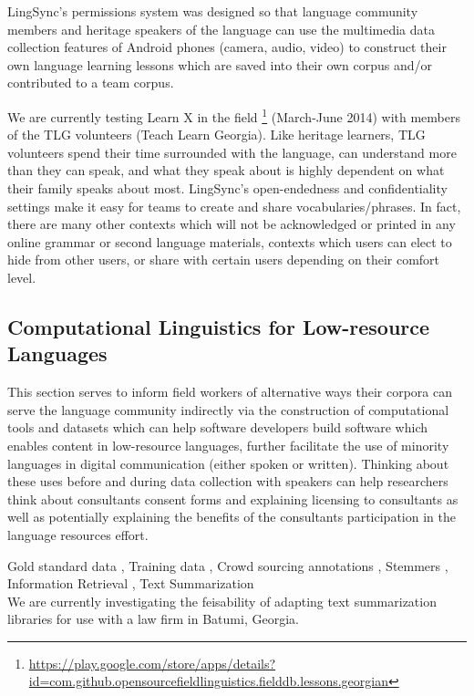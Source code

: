 \documentclass[11pt]{article}
\begin{document}
LingSync's permissions system was designed so that language community members
and heritage speakers of the language can use the multimedia data collection
features of Android phones (camera, audio, video) to construct their own
language learning lessons which are saved into their own corpus and/or
contributed to a team corpus.

We are currently testing Learn X in the field%
\footnote{\url{https://play.google.com/store/apps/details?id=com.github.opensourcefieldlinguistics.fielddb.lessons.georgian}} %
(March-June 2014) with members of the TLG volunteers (Teach Learn Georgia).
Like heritage learners, TLG volunteers spend their time surrounded with the
language, can understand more than they can speak, and what they speak about is
highly dependent on what their family speaks about most. LingSync's
open-endedness and confidentiality settings make it easy for teams to create
and share vocabularies/phrases.
In fact, there are many other contexts which will not be acknowledged or printed
in any online grammar or second language materials, contexts which users can
elect to hide from other users, or share with certain users depending on their
comfort level.


\subsection{Computational Linguistics for Low-resource Languages}

This section serves to inform field workers of alternative ways their corpora can serve the language community indirectly via the construction of computational tools and datasets which can help software developers build software which enables content in low-resource languages, further facilitate the use of minority languages in digital communication (either spoken or written). Thinking about these uses before and during data collection with speakers can help researchers think about consultants consent forms and explaining licensing to consultants as well as potentially explaining the benefits of the consultants participation in the language resources effort.

	 Gold standard data
	, Training data
	, Crowd sourcing annotations
	, Stemmers
	, Information Retrieval
	, Text Summarization\\
	
	We are currently investigating the feisability of adapting text summarization libraries for use with a law firm in Batumi, Georgia. 
	
\end{document}
